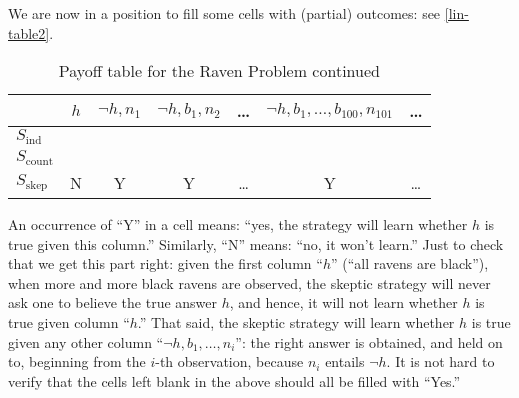 We are now in a position to fill some cells with (partial) outcomes: see \autoref{lin-table2}.
\begin{table}[ht]
\centering
\begin{tabular}{lcccccc}
	\hline
	& $h$ & $\neg h, n_1$ & $\neg h, b_1, n_2$ & \ldots & $\neg h, b_1, \ldots, b_{100}, n_{101}$ & \ldots \\
	\hline\hline
  	$S_{\textrm{ind}}$ &&&&&& \\
  	$S_{\textrm{count}}$ &&&&&& \\
	$S_{\textrm{skep}}$ & N & Y & Y & \ldots & Y & \ldots\\
	\hline
\end{tabular}
\caption{Payoff table for the Raven Problem continued}\label{lin-table2}
\end{table}
An occurrence of ``Y'' in a cell means: ``yes, the strategy will learn whether $h$ is true given this column.'' Similarly, ``N'' means: ``no, it won't learn.'' Just to check that we get this part right: given the first column ``$h$'' (``all ravens are black''), when more and more black ravens are observed, the skeptic strategy will never ask one to believe the true answer $h$, and hence, it will not learn whether $h$ is true given column ``$h$.'' That said, the skeptic strategy will learn whether $h$ is true given any other column ``$\neg h, b_1, \ldots, n_{i}$'': the right answer is obtained, and held on to, beginning from the $i$-th observation, because $n_{i}$ entails $\neg h$. It is not hard to verify that the cells left blank in the above should all be filled with ``Yes.''

